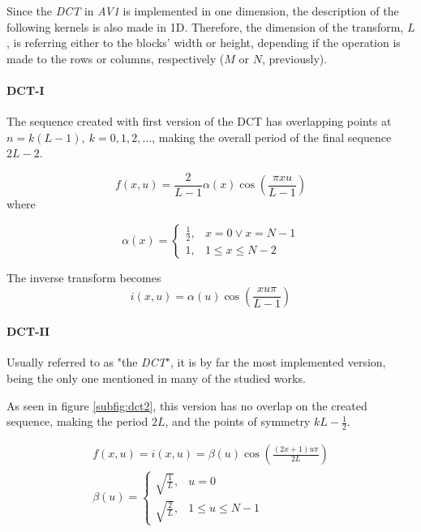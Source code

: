 
Since the \emph{DCT} in \emph{AV1} is implemented in one dimension, the description of the following kernels is also made in 1D. Therefore, the dimension of the transform, $L$, is referring either to the blocks' width or height, depending if the operation is made to the rows or columns, respectively ($M$ or $N$, previously).

\paragraph{DCT-I}

The sequence created with first version of the DCT has overlapping points at $n = k(L-1) ,\ k = 0,1,2,...$, making the overall period of the final sequence $2L-2$.

\begin{equation}
    f(x,u) = \frac{2}{L-1}\alpha(x)\cos\left(\frac{\pi xu}{L-1}\right)
\end{equation}
where

\begin{equation}
    \alpha(x)= \begin{cases}
                    \frac{1}{2}, & x=0 \lor x = N-1 \\
                    1, & 1 \leq x \leq N-2
                \end{cases}
\end{equation}

The inverse transform becomes
\begin{equation}
    i(x,u) = \alpha(u)\cos\left(\frac{xu\pi}{L-1}\right)
\end{equation}

\paragraph{DCT-II}

Usually referred to as "the \emph{DCT}", it is by far the most implemented version, being the only one mentioned in many of the studied works.

As seen in figure \ref{subfig:dct2}, this version has no overlap on the created sequence, making the period $2L$, and the points of symmetry $kL - \frac{1}{2}$.

\begin{gather}
    f(x,u) = i(x,u) = \beta(u)\cos\left(\frac{(2x+1)u\pi }{2L}\right) \\
    \beta(u)= \begin{cases}
                    \sqrt{\frac{1}{L}}, & u=0 \\
                    \sqrt{\frac{2}{L}}, & 1 \leq u \leq N-1
                \end{cases}
\end{gather}

